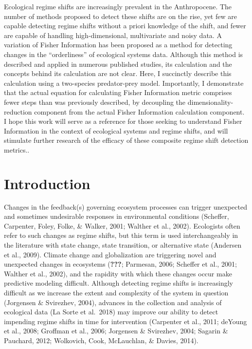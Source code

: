 \documentclass[12pt,twoside,openany]{reedthesis}
\begin{document}
Ecological regime shifts are increasingly prevalent in the Anthropocene. The number of methods proposed to detect these shifts are on the rise, yet few are capable detecting regime shifts without a priori knowledge of the shift, and fewer are capable of handling high-dimensional, multivariate and noisy data. A variation of Fisher Information has been proposed as a method for detecting changes in the ``orderliness'' of ecological systems data. Although this method is described and applied in numerous published studies, its calculation and the concepts behind its calculation are not clear. Here, I succinctly describe this calculation using a two-species predator-prey model. Importantly, I demonstrate that the actual equation for calculating Fisher Information metric comprises fewer steps than was previously described, by decoupling the dimensionality-reduction component from the actual Fisher Information calculation component. I hope this work will serve as a reference for those seeking to understand Fisher Information in the context of ecological systems and regime shifts, and will stimulate further research of the efficacy of these composite regime shift detection metrics..

\hypertarget{introduction-1}{%
\section{Introduction}\label{introduction-1}}

Changes in the feedback(s) governing ecosystem processes can trigger unexpected and sometimes undesirable responses in environmental conditions (Scheffer, Carpenter, Foley, Folke, \& Walker, 2001; Walther et al., 2002). Ecologists often refer to such changes as regime shifts, but this term is used interchangeably in the literature with state change, state transition, or alternative state (Andersen et al., 2009). Climate change and globalization are triggering novel and unexpected changes in ecosystems ({\textbf{???}}; Parmesan, 2006; Scheffer et al., 2001; Walther et al., 2002), and the rapidity with which these changes occur make predictive modeling difficult. Although detecting regime shifts is increasingly difficult as we increase the extent and complexity of the system in question (Jorgensen \& Svirezhev, 2004), advances in the collection and analysis of ecological data (La Sorte et al.~2018) may improve our ability to detect impending regime shifts in time for intervention (Carpenter et al., 2011; deYoung et al., 2008; Groffman et al., 2006; Jorgensen \& Svirezhev, 2004; Sagarin \& Pauchard, 2012; Wolkovich, Cook, McLauchlan, \& Davies, 2014).
\end{document}
